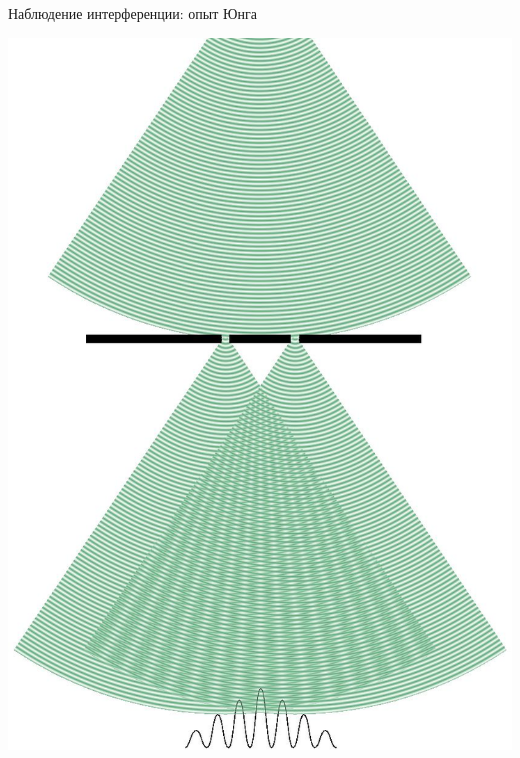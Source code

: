 \documentclass[usenames,dvipsnames,pdftex,unicode,hidelinks]{beamer}
\begin{document}
  \begin{frame}{Наблюдение интерференции: опыт Юнга}
    \begin{center}
      \includegraphics[height=0.75\textheight]{young}
    \end{center}
  \end{frame}
\end{document}
